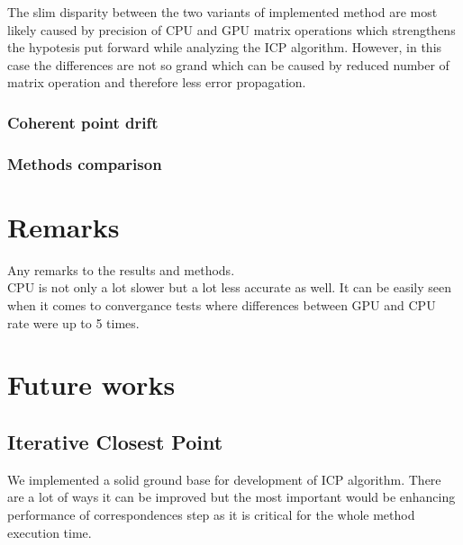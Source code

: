 \documentclass[titlepage]{article}
\begin{document}
The slim disparity between the two variants of implemented method are most likely caused by precision of CPU and GPU matrix operations which strengthens the hypotesis put forward while analyzing the ICP algorithm. However, in this case the differences are not so grand which can be caused by reduced number of matrix operation and therefore less error propagation.



\subsubsection{Coherent point drift}
\subsubsection{Methods comparison}


\section{Remarks}
Any remarks to the results and methods.\\

CPU is not only a lot slower but a lot less accurate as well. It can be easily seen when it comes to convergance tests where differences between GPU and CPU rate were up to 5 times.

\section{Future works}

\subsection{Iterative Closest Point}
We implemented a solid ground base for development of ICP algorithm. There are a lot of ways it can be improved but the most important would be enhancing performance of correspondences step as it is critical for the whole method execution time. 
\end{document}
